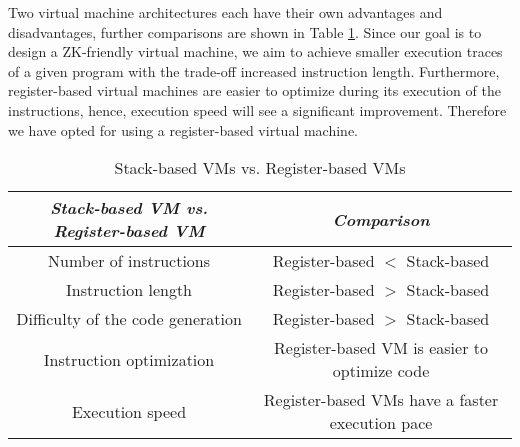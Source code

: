 Two virtual machine architectures each have their own advantages and disadvantages, further comparisons are shown in Table \ref{table:stacked-or-register}. Since our goal is to design a ZK-friendly virtual machine, we aim to achieve smaller execution traces of a given program with the trade-off increased instruction length. Furthermore, register-based virtual machines are easier to optimize during its execution of the instructions, hence, execution speed will see a significant improvement. Therefore we have opted for using a register-based virtual machine.
\begin{table}[!ht]
    \centering
    \begin{tabular}{|c|c|}
    \hline
        \emph{Stack-based VM vs. Register-based VM} & \emph{Comparison} \\ \hline
        Number of instructions & Register-based $<$ Stack-based \\
        Instruction length & Register-based $>$ Stack-based \\
        Difficulty of the code generation & Register-based $>$ Stack-based \\
        Instruction optimization & Register-based VM is easier to optimize code \\
        Execution speed & Register-based VMs have a faster execution pace \\ \hline
    \end{tabular}
    \caption{Stack-based VMs vs. Register-based VMs}
    \label{table:stacked-or-register}
\end{table}
